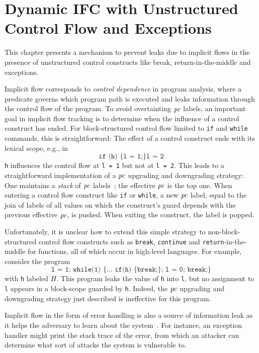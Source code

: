 \chapter{Dynamic IFC with Unstructured Control Flow and Exceptions}
\label{ch:ucfe}
This chapter presents a mechanism to prevent leaks due to implicit
flows in the presence of unstructured control constructs like break,
return-in-the-middle and exceptions.  

Implicit flow corresponds to \emph{control dependence} in program
analysis, where a predicate governs which program path is executed and
leaks information through the control flow of the program. To avoid
overtainting $\mathit{pc}$ labels, an important goal in implicit flow 
tracking is to determine when the influence of a control construct has
ended. For block-structured control flow limited to \texttt{if} and
\texttt{while} commands, this is straightforward: The effect of a
control construct ends with its lexical scope, e.g., in 
$$\texttt{if (h) \{l = 1;\} l = 2}$$
\texttt{h} influences the control flow at
\texttt{l = 1} but not at \texttt{l = 2}. This leads to a
straightforward implementation of a $\mathit{pc}$ upgrading and downgrading
strategy: One maintains a \emph{stack} of $\mathit{pc}$
labels~\cite{zdancewic02PhD}; the effective $\mathit{pc}$ is the top one. When
entering a control flow construct like \texttt{if} or \texttt{while},
a new $\mathit{pc}$ label, equal to the join of labels of all values on which
the construct's guard depends with the previous effective $\mathit{pc}$, is
pushed. When exiting the construct, the label is popped.

Unfortunately, it is unclear how to extend this simple strategy to
non-block-struct\-ured control flow constructs such as 
\texttt{break}, \texttt{continue} and \texttt{return}-in-the-middle
for functions, all of which occur in high-level languages. For
example, consider the program 
$$\texttt{l = 1; while(1) \{... if(h) \{break;\}; l = 0; break;\}}$$ 
with \texttt{h} labeled $H$. This program leaks the
value of \texttt{h} into \texttt{l}, but no assignment to \texttt{l}
appears in a block-scope guarded by \texttt{h}. Indeed, the $\mathit{pc}$
upgrading and downgrading strategy just described is ineffective for
this program. 

Implicit flow in the form of error handling is also a  
source of information leak as it helps the adversary to learn about
the system~\cite{leak}. For instance, an exception handler might print 
the stack trace of the error, from which an attacker can determine what
sort of attacks the system is vulnerable to. 

